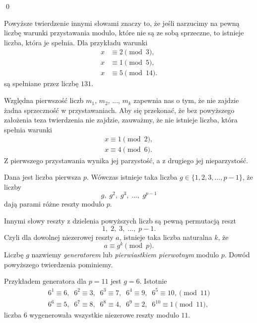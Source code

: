 \qed
\vspace{5px}

\noindent
Powyższe twierdzenie innymi słowami znaczy to, że jeśli narzucimy na pewną liczbę warunki przystawania modulo, które nie są ze sobą sprzeczne, to istnieje liczba, która je spełnia. Dla przykładu warunki
\begin{align*}
	x &\equiv 2 \pmod{3}, \\
	x &\equiv 1 \pmod{5}, \\
	x &\equiv 5 \pmod{14}.
\end{align*}
są spełniane przez liczbę $131$.

\vspace{10px}

\noindent
Względna pierwszość liczb $m_1$, $m_2$, ..., $m_k$ zapewnia nas o tym, że nie zajdzie żadna sprzeczność w przystawaniach. Aby się przekonać, że bez powyższego założenia teza twierdzenia nie zajdzie, zauważmy, że nie istnieje liczba, która spełnia warunki
\begin{gather*}
	x \equiv 1 \pmod{2}, \\
	x \equiv 4 \pmod{6}.
\end{gather*}
Z pierwszego przystawania wynika jej parzystość, a z drugiego jej nieparzystość.

\vspace{10px}


\noindent
Dana jest liczba pierwsza $p$. Wówczas istnieje taka liczba $g \in \{1, 2, 3, ..., p - 1\}$, że liczby 
\[
	g,\; g^2,\; g^3,\; ...,\; g^{p - 1}
\]
dają parami różne reszty modulo $p$.

\vspace{20px}

\noindent
Innymi słowy reszty z dzielenia powyższych liczb są pewną permutacją reszt
\[
	1,\; 2,\; 3,\; ...,\;  p - 1.
\]
Czyli dla dowolnej niezerowej reszty $a$, istnieje taka liczba naturalna $k$, że 
\[
	a \equiv g^k \pmod{p}.
\]
Liczbę $g$ nazwiemy \textit{generatorem} lub \textit{pierwiastkiem pierwotnym} modulo $p$. Dowód powyższego twierdzenia pominiemy.

\vspace{10px}

\noindent
Przykładem generatora dla $p = 11$ jest $g = 6$. Istotnie
\begin{gather*}
	6^1 \equiv 6, \;\; 6^2 \equiv 3, \;\; 6^3 \equiv 7, \;\;
	6^4 \equiv 9, \;\; 6^5 \equiv 10, \pmod{11} \\
	 6^6 \equiv 5, \;\;
	6^7 \equiv 8, \;\; 6^8 \equiv 4, \;\; 6^9 \equiv 2, \;\; 6^{10} \equiv 1 \pmod{11},
\end{gather*}
liczba $6$ wygenerowała wszystkie niezerowe reszty modulo $11$.

